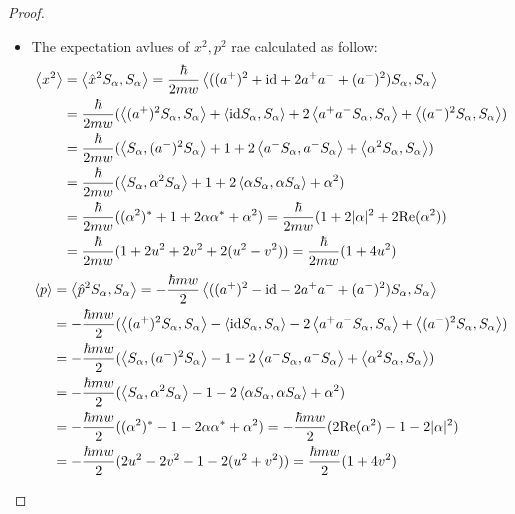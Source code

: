 \documentclass{article}
\begin{document}
\begin{proof}
\begin{itemize}
        \item[(b)] The expectation avlues of $x^2,p^2$ rae calculated as follow:
        \begin{align}
            \left<x^2\right>&=\left<\hat{x}^2S_\alpha,S_\alpha\right>=\frac{\hbar}{2mw}\left<((a^+)^2+\mathrm{id}+2a^+a^-+(a^-)^2)S_\alpha,S_\alpha\right>\\
            &= \frac{\hbar}{2mw}(\left<(a^+)^2S_\alpha,S_\alpha\right>+\left<\mathrm{id} S_\alpha,S_\alpha\right>+2\left<a^+a^-S_\alpha,S_\alpha\right>+\left<(a^-)^2S_\alpha,S_\alpha\right>)\\
            &= \frac{\hbar}{2mw}(\left<S_\alpha,(a^-)^2S_\alpha\right>+1+2\left<a^-S_\alpha,a^-S_\alpha\right>+\left<\alpha^2S_\alpha,S_\alpha\right>)\\
            &= \frac{\hbar}{2mw}(\left<S_\alpha,\alpha^2S_\alpha\right>+1+2\left<\alpha S_\alpha,\alpha S_\alpha\right>+\alpha^2)\\
            &= \frac{\hbar}{2mw}((\alpha^2)^*+1+2\alpha\alpha^*+\alpha^2) = \frac{\hbar}{2mw}(1+2|\alpha|^2+2\mathrm{Re}(\alpha^2))\\
            &= \frac{\hbar}{2mw}(1+2u^2+2v^2+2(u^2-v^2)) = \frac{\hbar}{2mw}(1+4u^2)
        \end{align}
        \begin{align}
            \left<p\right>&=\left<\hat{p}^2S_\alpha,S_\alpha\right>=-\frac{\hbar mw}{2}\left<((a^+)^2-\mathrm{id}-2a^+a^-+(a^-)^2)S_\alpha,S_\alpha\right>\\
            &= -\frac{\hbar mw}{2}(\left<(a^+)^2S_\alpha,S_\alpha\right>-\left<\mathrm{id} S_\alpha,S_\alpha\right>-2\left<a^+a^-S_\alpha,S_\alpha\right>+\left<(a^-)^2S_\alpha,S_\alpha\right>)\\
            &= -\frac{\hbar mw}{2}(\left<S_\alpha,(a^-)^2S_\alpha\right>-1-2\left<a^-S_\alpha,a^-S_\alpha\right>+\left<\alpha^2S_\alpha,S_\alpha\right>)\\
            &= -\frac{\hbar mw}{2}(\left<S_\alpha,\alpha^2S_\alpha\right>-1-2\left<\alpha S_\alpha,\alpha S_\alpha\right>+\alpha^2)\\
            &= -\frac{\hbar mw}{2}((\alpha^2)^*-1-2\alpha\alpha^*+\alpha^2) = -\frac{\hbar mw}{2}(2\mathrm{Re}(\alpha^2)-1-2|\alpha|^2)\\
            &= -\frac{\hbar mw}{2}(2u^2-2v^2-1-2(u^2+v^2))=\frac{\hbar mw}{2}(1+4v^2)
        \end{align}

        \hfil


\end{itemize}
\end{proof}
\end{document}
